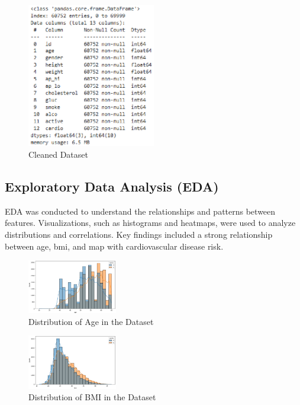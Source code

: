 \documentclass[12pt]{article}
\begin{document}
\begin{figure}[H]
\centering
\captionsetup{font=small}
\includegraphics[width=0.5\textwidth]{dataset_cleaned.eps} 
\caption{Cleaned Dataset}
\label{fig:age_distribution}
\end{figure}

\subsection{Exploratory Data Analysis (EDA)}
EDA was conducted to understand the relationships and patterns between features. Visualizations, such as histograms and heatmaps, were used to analyze distributions and correlations. Key findings included a strong relationship between age, bmi, and map with cardiovascular disease risk.  

\begin{figure}[H]
\centering
\captionsetup{font=small}
\includegraphics[width=0.35\textwidth]{graph1.eps}  %
\caption{Distribution of Age in the Dataset}
\label{fig:age_distribution}
\end{figure}

\begin{figure}[H]
\centering
\captionsetup{font=small}
\includegraphics[width=0.35\textwidth]{graph2.eps}  %
\caption{Distribution of BMI in the Dataset}
\label{fig:bmi}
\end{figure}
\end{document}
